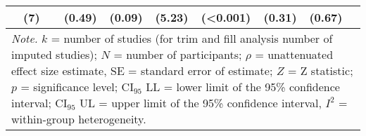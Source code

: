 \begin{table}[ht]
\begin{tabular}{lccccccccc}
   & (7) &  & (0.49) & (0.09) & (5.23) & (<0.001) & (0.31) & (0.67) &  \\ 
   \hline 
 \multicolumn{10}{p{0.95\textwidth}}{\scriptsize{\textit{Note.} $k$ = number of studies (for trim and fill analysis number of imputed studies); $N$ = number of participants; $\rho$ = unattenuated effect size estimate, SE = standard error of estimate; $Z$ = Z statistic; $p$ = significance level; $\textrm{CI}_{95}$ LL = lower limit of the 95\% confidence interval; $\textrm{CI}_{95}$ UL = upper limit of the 95\% confidence interval, $I^2$ = within-group heterogeneity.}} 
\end{tabular}
\endgroup
\end{table}
